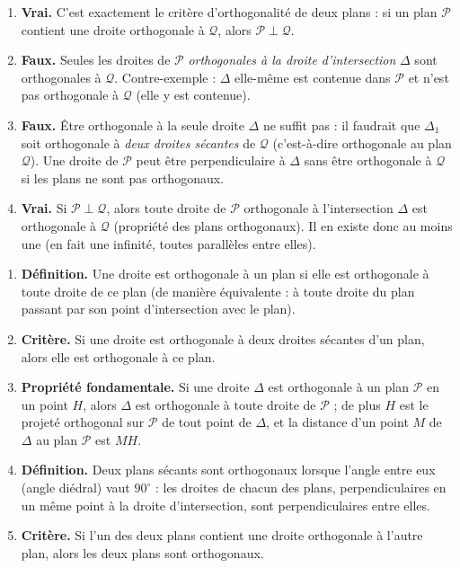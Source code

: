 \documentclass[11pt]{article}
\newcommand{\cle}[1]{{\popxbold\color{popdark}#1}}
\begin{document}
\begin{corrige}
\begin{enumerate}
\item \textbf{Vrai.} C'est exactement le \cle{critère d'orthogonalité} de deux plans : si un plan $\mathcal{P}$ contient une droite orthogonale à $\mathcal{Q}$, alors $\mathcal{P} \perp \mathcal{Q}$.
\item \textbf{Faux.} Seules les droites de $\mathcal{P}$ \emph{orthogonales à la droite d'intersection} $\Delta$ sont orthogonales à $\mathcal{Q}$. Contre-exemple : $\Delta$ elle-même est contenue dans $\mathcal{P}$ et n'est pas orthogonale à $\mathcal{Q}$ (elle y est contenue).
\item \textbf{Faux.} Être orthogonale à la seule droite $\Delta$ ne suffit pas : il faudrait que $\Delta_1$ soit orthogonale à \emph{deux droites sécantes} de $\mathcal{Q}$ (c'est-à-dire orthogonale au plan $\mathcal{Q}$). Une droite de $\mathcal{P}$ peut être perpendiculaire à $\Delta$ sans être orthogonale à $\mathcal{Q}$ si les plans ne sont pas orthogonaux.
\item \textbf{Vrai.} Si $\mathcal{P} \perp \mathcal{Q}$, alors toute droite de $\mathcal{P}$ orthogonale à l'intersection $\Delta$ est orthogonale à $\mathcal{Q}$ (propriété des plans orthogonaux). Il en existe donc au moins une (en fait une infinité, toutes parallèles entre elles).
\end{enumerate}
\end{corrige}

\begin{corrige}
\begin{enumerate}
\item \textbf{Définition.} Une droite est orthogonale à un plan si elle est orthogonale à \cle{toute droite} de ce plan (de manière équivalente : à toute droite du plan passant par son point d'intersection avec le plan).
\item \textbf{Critère.} Si une droite est orthogonale à \cle{deux droites sécantes} d'un plan, alors elle est orthogonale à ce plan.
\item \textbf{Propriété fondamentale.} Si une droite $\Delta$ est orthogonale à un plan $\mathcal{P}$ en un point $H$, alors $\Delta$ est orthogonale à toute droite de $\mathcal{P}$ ; de plus $H$ est le \cle{projeté orthogonal} sur $\mathcal{P}$ de tout point de $\Delta$, et la distance d'un point $M$ de $\Delta$ au plan $\mathcal{P}$ est $MH$.
\item \textbf{Définition.} Deux plans sécants sont orthogonaux lorsque l'angle entre eux (angle diédral) vaut $90^\circ$ : les droites de chacun des plans, perpendiculaires en un même point à la droite d'intersection, sont perpendiculaires entre elles.
\item \textbf{Critère.} Si l'un des deux plans contient une droite orthogonale à l'autre plan, alors les deux plans sont orthogonaux.
\end{enumerate}
\end{corrige}
\end{document}
